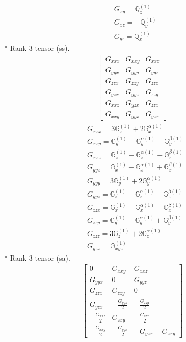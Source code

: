 \documentclass[fleqn,8pt,landscape]{jsarticle}
\begin{document}
\begin{align*}
& G_{xy} = \mathbb{Q}_{z}^{(1)} \\
& G_{xz} = - \mathbb{Q}_{y}^{(1)} \\
& G_{yz} = \mathbb{Q}_{x}^{(1)}
\end{align*}
* Rank 3 tensor (ss).
\begin{align*}
\begin{bmatrix} G_{xxx} & G_{xxy} & G_{xxz} \\ G_{yyx} & G_{yyy} & G_{yyz} \\ G_{zzx} & G_{zzy} & G_{zzz} \\ G_{yzx} & G_{yyz} & G_{zzy} \\ G_{xxz} & G_{yzx} & G_{zzx} \\ G_{xxy} & G_{yyx} & G_{yzx} \end{bmatrix}
\end{align*}
\begin{align*}
& G_{xxx} = 3 \mathbb{G}_{x}^{(1)} + 2 \mathbb{G}_{x}^{\alpha(1)} \\
& G_{xxy} = \mathbb{G}_{y}^{(1)} - \mathbb{G}_{y}^{\alpha(1)} - \mathbb{G}_{y}^{\beta(1)} \\
& G_{xxz} = \mathbb{G}_{z}^{(1)} - \mathbb{G}_{z}^{\alpha(1)} + \mathbb{G}_{z}^{\beta(1)} \\
& G_{yyx} = \mathbb{G}_{x}^{(1)} - \mathbb{G}_{x}^{\alpha(1)} + \mathbb{G}_{x}^{\beta(1)} \\
& G_{yyy} = 3 \mathbb{G}_{y}^{(1)} + 2 \mathbb{G}_{y}^{\alpha(1)} \\
& G_{yyz} = \mathbb{G}_{z}^{(1)} - \mathbb{G}_{z}^{\alpha(1)} - \mathbb{G}_{z}^{\beta(1)} \\
& G_{zzx} = \mathbb{G}_{x}^{(1)} - \mathbb{G}_{x}^{\alpha(1)} - \mathbb{G}_{x}^{\beta(1)} \\
& G_{zzy} = \mathbb{G}_{y}^{(1)} - \mathbb{G}_{y}^{\alpha(1)} + \mathbb{G}_{y}^{\beta(1)} \\
& G_{zzz} = 3 \mathbb{G}_{z}^{(1)} + 2 \mathbb{G}_{z}^{\alpha(1)} \\
& G_{yzx} = \mathbb{G}_{xyz}^{(1)}
\end{align*}
* Rank 3 tensor (sa).
\begin{align*}
\begin{bmatrix} 0 & G_{xxy} & G_{xxz} \\ G_{yyx} & 0 & G_{yyz} \\ G_{zzx} & G_{zzy} & 0 \\ G_{yzx} & - \frac{G_{yyz}}{2} & - \frac{G_{zzy}}{2} \\ - \frac{G_{xxz}}{2} & G_{zxy} & - \frac{G_{zzx}}{2} \\ - \frac{G_{xxy}}{2} & - \frac{G_{yyx}}{2} & - G_{yzx} - G_{zxy} \end{bmatrix}
\end{align*}
\end{document}
